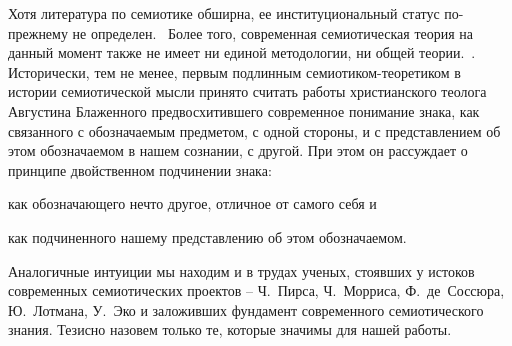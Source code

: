 Хотя литература по семиотике обширна, ее институциональный статус по-прежнему не определен.~\autocite{sirotkin}
Более того, современная семиотическая теория на данный момент также не имеет ни
единой методологии, ни общей теории.~\autocite{gorny}\autocite{gasparov}. Исторически, тем не менее,
первым подлинным семиотиком-теоретиком в истории семиотической мысли принято считать работы
христианского теолога Августина Блаженного предвосхитившего современное понимание
знака, как связанного с обозначаемым предметом, с одной стороны, и с представлением об этом
обозначаемом в нашем сознании, с другой. При этом он рассуждает о принципе двойственном подчинении знака:
\begin{enumerate*}[label=\asbuk*)]
    \item как обозначающего нечто другое, отличное от самого себя и
    \item как подчиненного нашему представлению об этом обозначаемом.~\autocite{gorny}
\end{enumerate*}
Аналогичные интуиции мы находим и в трудах ученых, стоявших у истоков современных семиотических проектов --
Ч.~Пирса, Ч.~Морриса, Ф.~де~Соссюра, Ю.~Лотмана, У.~Эко и заложивших фундамент
современного семиотического знания. Тезисно назовем только те, которые значимы для нашей работы.

